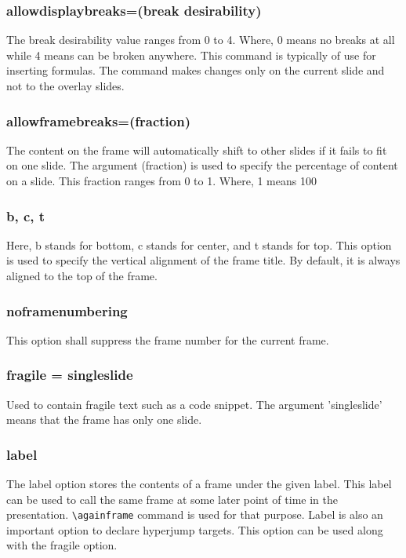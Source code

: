 \subsubsection{{\ttfamily allowdisplaybreaks=(break desirability)}}
The break desirability value ranges from 0 to 4. Where, 0 means no breaks at all while 4 means can be broken anywhere. This command is typically of use for inserting formulas. The command makes changes only on the current slide and not to the overlay slides.

\subsubsection{{\ttfamily allowframebreaks=(fraction)}}
The content on the frame will automatically shift to other slides if it fails to fit on one slide. The argument (fraction) is used to specify the percentage of content on a slide. This fraction ranges from 0 to 1. Where, 1 means 100%

\subsubsection{{\ttfamily b, c, t}}
Here, {\ttfamily b} stands for bottom, {\ttfamily c} stands for center, and {\ttfamily t} stands for top. This option is used to specify the vertical alignment of the frame title. By default, it is always aligned to the top of the frame.

\subsubsection{{\ttfamily noframenumbering}}
This option shall suppress the frame number for the current frame.

\subsubsection{{\ttfamily fragile = singleslide}}
Used to contain fragile text such as a code snippet. The argument ’singleslide’ means that the frame has only one slide.

\subsubsection{{\ttfamily label}}
The label option stores the contents of a frame under the given label. This label can be used to call the same frame at some later point of time in the presentation. \verb|\againframe| command is used for that purpose. Label is also an important option to declare hyperjump targets. This option can be used along with the fragile option.

